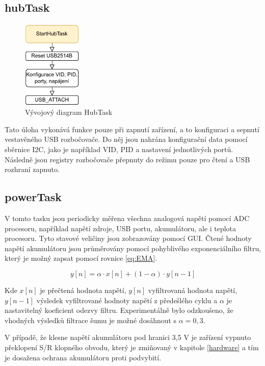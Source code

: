 \subsection{hubTask}
\begin{figure}[h]
    \centering
    \includegraphics[width=0.25\textwidth]{obrazky/HubTask}
    \caption{Vývojový diagram HubTask}
\end{figure}
Tato úloha vykonává funkce pouze při zapnutí zařízení, a to konfiguraci a sepnutí vestavěného \ac{USB} rozbočovače. Do něj jsou nahrána konfigurační data pomocí sběrnice I2C, jako je například \ac{VID}, \ac{PID} a nastavení jednotlivých portů. Následně jsou registry rozbočovače přepnuty do režimu pouze pro čtení a \ac{USB} rozhraní zapnuto.
\subsection{powerTask}
V tomto tasku jsou periodicky měřena všechna analogová napětí pomocí \ac{ADC} procesoru, například napětí zdroje, USB portu, akumulátoru, ale i teplota procesoru. Tyto stavové veličiny jsou zobrazovány pomocí \ac{GUI}. Čtené hodnoty napětí akumulátoru jsou průměrovány pomocí pohyblivého exponenciálního filtru, který je možný zapsat pomocí rovnice \ref{eq:EMA}.

\begin{equation} \label{eq:EMA}
y[n]=\alpha \cdot x[n] + (1-\alpha)\cdot y[n-1]
\end{equation}

Kde $ x[n] $ je přečtená hodnota napětí, $ y[n] $ vyfiltrovaná hodnota napětí, $ y[n-1] $ výsledek vyfiltrované hodnoty napětí z předešlého cyklu a $ \alpha $ je nastavitelný koeficient odezvy filtru. Experimentálně bylo odzkoušeno, že vhodných výsledků filtrace šumu je možné dosáhnout s $ \alpha = 0,3$.

V případě, že klesne napětí akumulátoru pod hranici 3,5 V je zařízení vypnuto překlopení S/R klopného obvodu, který je zmiňovaný v kapitole \ref{hardware} a tím je dosažena ochrana akumulátoru proti podvybití.


